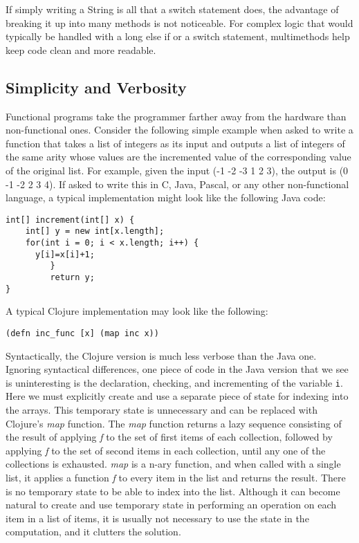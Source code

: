 If simply writing a String is all that a switch statement does, the advantage of breaking it up into many
methods is not noticeable. For complex logic that would typically be handled with a long else if or a switch statement, 
multimethods help keep code clean and more readable.

\subsection{Simplicity and Verbosity}
Functional programs take the programmer farther away from the hardware
than non-functional ones. 
Consider the following simple example when asked to write a function
that takes a list of integers as its input and outputs a list of
integers of the same arity whose values are the incremented value of
the corresponding value of the original list. 
For example, given the input (-1 -2 -3 1 2 3), the output is (0 -1
-2 2 3 4). 
If asked to write this in C, Java, Pascal, or any other non-functional language, a typical implementation might look like the following Java code: 

\lstset{language=Java}
\begin{lstlisting}
int[] increment(int[] x) {
	int[] y = new int[x.length];
	for(int i = 0; i < x.length; i++) { 
	  y[i]=x[i]+1;
         }
         return y;
}
\end{lstlisting}

A typical Clojure implementation may look like the following: 

\lstset{language=Clojure}
\begin{lstlisting}
(defn inc_func [x] (map inc x))
\end{lstlisting}

Syntactically, the Clojure version is much less verbose than the Java one.
Ignoring syntactical differences, one piece of code in the Java version that we see is uninteresting is the declaration,
checking, and incrementing of the variable {\tt i}. 
Here we must explicitly create and use a separate piece of state for indexing into the arrays. 
This temporary state is unnecessary and can be replaced with Clojure's
{\it map} function. The {\it map} function returns a lazy sequence
consisting of the result of applying {\it f} to the
set of first items of each collection, followed by applying {\it f} to the set
of second items in each collection, until any one of the collections is
exhausted. {\it map} is a n-ary function, and when called with a
single list, it applies a function {\it f} to every item in the list
and returns the result. 
There is no temporary state to be able to index into the list. 
Although it can become natural to create and use temporary state in performing an operation on each item in a list of items,
it is usually not necessary to use the state in the computation, and it clutters the solution. 

